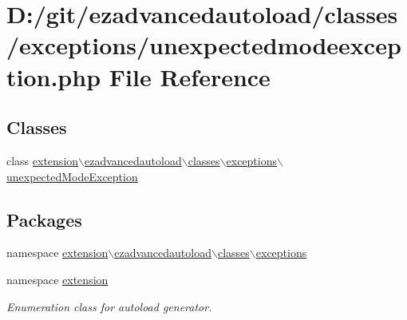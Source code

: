 \hypertarget{unexpectedmodeexception_8php}{\section{\-D\-:/git/ezadvancedautoload/classes/exceptions/unexpectedmodeexception.php \-File \-Reference}
\label{unexpectedmodeexception_8php}
}
\subsection*{\-Classes}
\begin{DoxyCompactItemize}
\item 
class \hyperlink{classextension_1_1ezadvancedautoload_1_1classes_1_1exceptions_1_1unexpected_mode_exception}{extension$\backslash$ezadvancedautoload$\backslash$classes$\backslash$exceptions$\backslash$unexpected\-Mode\-Exception}
\end{DoxyCompactItemize}
\subsection*{\-Packages}
\begin{DoxyCompactItemize}
\item 
namespace \hyperlink{namespaceextension_1_1ezadvancedautoload_1_1classes_1_1exceptions}{extension$\backslash$ezadvancedautoload$\backslash$classes$\backslash$exceptions}
\item 
namespace \hyperlink{namespaceextension}{extension}
\begin{DoxyCompactList}\small\item\em \-Enumeration class for autoload generator. \end{DoxyCompactList}\end{DoxyCompactItemize}

